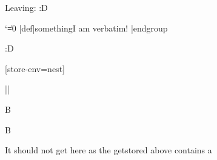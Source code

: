 



\scontents[store-env=another]
Leaving:
\bye :D
\endscontents

\scontents[store-env=test]
\begingroup
  \catcode`\|=0
  |def|something{I am verbatim!}
|endgroup
\something
\endscontents

\scontents[store-env=test]
\hello :D
\endscontents

[store-env=nest]

\scnest
\def\nested{A}
\scnest
\def\nested{B}
\endscnest
\endscnest

\Scontents*{\abcde}
\Scontents*|\fghij|





\nested

\nested


It should not get here as the getstored above contains a \bye
